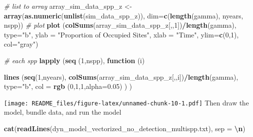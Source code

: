 \documentclass[
]{article}
\newenvironment{Shaded}{\begin{snugshade}}{\end{snugshade}}
\newcommand{\AttributeTok}[1]{\textcolor[rgb]{0.13,0.29,0.53}{#1}}
\newcommand{\CommentTok}[1]{\textcolor[rgb]{0.56,0.35,0.01}{\textit{#1}}}
\newcommand{\ControlFlowTok}[1]{\textcolor[rgb]{0.13,0.29,0.53}{\textbf{#1}}}
\newcommand{\DecValTok}[1]{\textcolor[rgb]{0.00,0.00,0.81}{#1}}
\newcommand{\FloatTok}[1]{\textcolor[rgb]{0.00,0.00,0.81}{#1}}
\newcommand{\FunctionTok}[1]{\textcolor[rgb]{0.13,0.29,0.53}{\textbf{#1}}}
\newcommand{\NormalTok}[1]{#1}
\newcommand{\OtherTok}[1]{\textcolor[rgb]{0.56,0.35,0.01}{#1}}
\newcommand{\SpecialCharTok}[1]{\textcolor[rgb]{0.81,0.36,0.00}{\textbf{#1}}}
\newcommand{\StringTok}[1]{\textcolor[rgb]{0.31,0.60,0.02}{#1}}
\begin{document}
\begin{Shaded}
\begin{Highlighting}[]
\CommentTok{\# list to array}
\NormalTok{array\_sim\_data\_spp\_z }\OtherTok{\textless{}{-}} \FunctionTok{array}\NormalTok{(}\FunctionTok{as.numeric}\NormalTok{(}\FunctionTok{unlist}\NormalTok{(sim\_data\_spp\_z)), }
                              \AttributeTok{dim=}\FunctionTok{c}\NormalTok{(}\FunctionTok{length}\NormalTok{(gamma), }
\NormalTok{                                    nyears,}
\NormalTok{                                    nspp))}
\CommentTok{\# plot}
\FunctionTok{plot}\NormalTok{ (}\FunctionTok{colSums}\NormalTok{(array\_sim\_data\_spp\_z[,,}\DecValTok{1}\NormalTok{])}\SpecialCharTok{/}\FunctionTok{length}\NormalTok{(gamma), }\AttributeTok{type=}\StringTok{"b"}\NormalTok{, }
       \AttributeTok{ylab =} \StringTok{"Proportion of Occupied Sites"}\NormalTok{, }\AttributeTok{xlab =} \StringTok{"Time"}\NormalTok{,}
       \AttributeTok{ylim=}\FunctionTok{c}\NormalTok{(}\DecValTok{0}\NormalTok{,}\DecValTok{1}\NormalTok{),}
      \AttributeTok{col=}\StringTok{"gray"}\NormalTok{)}

\CommentTok{\# each spp}
\FunctionTok{lapply}\NormalTok{ (}\FunctionTok{seq}\NormalTok{ (}\DecValTok{1}\NormalTok{,nspp), }\ControlFlowTok{function}\NormalTok{ (i)}

  \FunctionTok{lines}\NormalTok{ (}\FunctionTok{seq}\NormalTok{(}\DecValTok{1}\NormalTok{,nyears),}
      \FunctionTok{colSums}\NormalTok{(array\_sim\_data\_spp\_z[,,i])}\SpecialCharTok{/}\FunctionTok{length}\NormalTok{(gamma), }\AttributeTok{type=}\StringTok{"b"}\NormalTok{, }
      \AttributeTok{col =} \FunctionTok{rgb}\NormalTok{ (}\DecValTok{0}\NormalTok{,}\DecValTok{1}\NormalTok{,}\DecValTok{1}\NormalTok{,}\AttributeTok{alpha=}\FloatTok{0.05}\NormalTok{) }
\NormalTok{      )}
\NormalTok{)}
\end{Highlighting}
\end{Shaded}

\texttt{[image: README\_files/figure-latex/unnamed-chunk-10-1.pdf]} Then
draw the model, bundle data, and run the model

\begin{Shaded}
\begin{Highlighting}[]
\FunctionTok{cat}\NormalTok{(}\FunctionTok{readLines}\NormalTok{(}\StringTok{\textquotesingle{}dyn\_model\_vectorized\_no\_detection\_multispp.txt\textquotesingle{}}\NormalTok{), }\AttributeTok{sep =} \StringTok{\textquotesingle{}}\SpecialCharTok{\textbackslash{}n}\StringTok{\textquotesingle{}}\NormalTok{)}
\end{Highlighting}
\end{Shaded}
\end{document}
